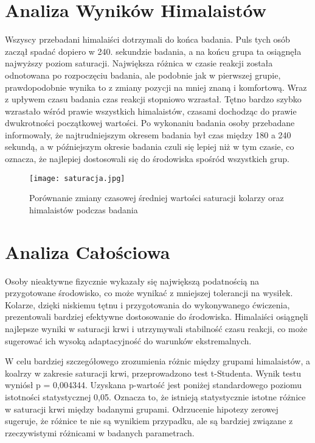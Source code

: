\section{Analiza Wyników Himalaistów}
Wszyscy przebadani himalaiści dotrzymali do końca badania. Puls tych osób zaczął spadać dopiero w 240. sekundzie badania, a na końcu grupa ta osiągnęła najwyższy poziom saturacji. Największa różnica w czasie reakcji została odnotowana po rozpoczęciu badania, ale podobnie jak w pierwszej grupie, prawdopodobnie wynika to z zmiany pozycji na mniej znaną i komfortową. Wraz z upływem czasu badania czas reakcji stopniowo wzrastał. Tętno bardzo szybko wzrastało wśród prawie wszystkich himalaistów, czasami dochodząc do prawie dwukrotności początkowej wartości. Po wykonaniu badania osoby przebadane informowały, że najtrudniejszym okresem badania był czas między 180 a 240 sekundą, a w późniejszym okresie badania czuli się lepiej niż w tym czasie, co oznacza, że najlepiej dostosowali się do środowiska spośród wszystkich grup.
\begin{figure}[!htb]
    \centering
    \texttt{[image: saturacja.jpg]}
    \caption{Porównanie zmiany czasowej średniej wartości saturacji kolarzy oraz himalaistów podczas badania}
\end{figure}



\section{Analiza Całościowa}
Osoby nieaktywne fizycznie wykazały się największą podatnością na przygotowane środowisko, co może wynikać z mniejszej tolerancji na wysiłek. Kolarze, dzięki niskiemu tętnu i przygotowania do wykonywanego ćwiczenia, prezentowali bardziej efektywne dostosowanie do środowiska. Himalaiści osiągnęli najlepsze wyniki w saturacji krwi i utrzymywali stabilność czasu reakcji, co może sugerować ich wysoką adaptacyjność do warunków ekstremalnych.

W celu bardziej szczegółowego zrozumienia różnic między grupami himalaistów, a koalrzy w zakresie saturacji krwi, przeprowadzono test t-Studenta. Wynik testu wyniósł p = 0,004344. Uzyskana p-wartość jest poniżej standardowego poziomu istotności statystycznej 0,05. Oznacza to, że istnieją statystycznie istotne różnice w saturacji krwi między badanymi grupami. Odrzucenie hipotezy zerowej sugeruje, że różnice te nie są wynikiem przypadku, ale są bardziej związane z rzeczywistymi różnicami w badanych parametrach.